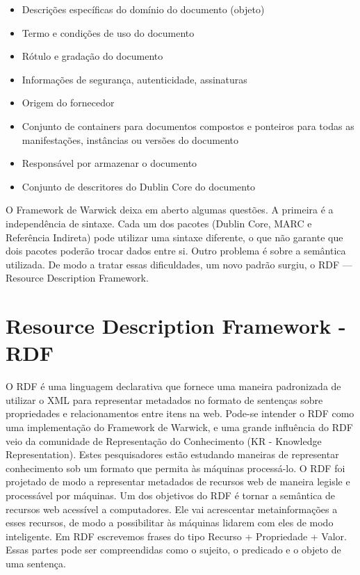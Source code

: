 \begin{itemize}
\item Descrições específicas do domínio do documento (objeto)
\item Termo e condições de uso do documento
\item Rótulo e gradação do documento
\item Informações de segurança, autenticidade, assinaturas
\item Origem do fornecedor
\item Conjunto de containers para documentos compostos e ponteiros para todas as manifestações, instâncias ou versões do documento
\item Responsável por armazenar o documento
\item Conjunto de descritores do Dublin Core do documento
\end{itemize}

O Framework de Warwick deixa em aberto algumas questões. A primeira é a independência de sintaxe. Cada um dos pacotes (Dublin Core, MARC e Referência Indireta) pode utilizar uma sintaxe diferente, o que não garante que dois pacotes poderão trocar dados entre si. Outro problema é sobre a semântica utilizada. De modo a tratar essas dificuldades, um novo padrão surgiu, o RDF — Resource Description Framework.

\section{Resource Description Framework - RDF}

O RDF é uma linguagem declarativa que fornece uma maneira padronizada de utilizar o XML para representar metadados no formato de sentenças sobre propriedades e relacionamentos entre itens na web. Pode-se intender o RDF como uma implementação do Framework  de Warwick, e uma grande influência do RDF veio da comunidade de Representação do Conhecimento (KR - Knowledge Representation). Estes pesquisadores estão estudando maneiras de representar conhecimento sob um formato que permita às máquinas processá-lo. O RDF foi projetado de modo a representar metadados de recursos web de maneira legisle e processável por máquinas.  Um dos objetivos do RDF é tornar a semântica de recursos web acessível a computadores. Ele vai acrescentar metainformações a esses recursos, de modo a possibilitar às máquinas lidarem com eles de modo inteligente. Em RDF escrevemos frases do tipo Recurso + Propriedade + Valor. Essas partes pode ser compreendidas como o sujeito, o predicado e o objeto de uma sentença.

